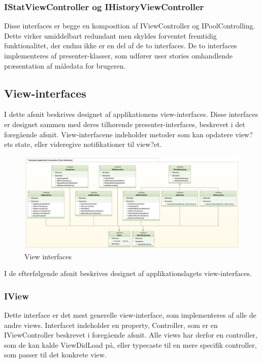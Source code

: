\subsubsection{IStatViewController og IHistoryViewController}
Disse interfaces er begge en komposition af IViewController og IPoolControlling. Dette virker umiddelbart redundant men skyldes forventet fremtidig funktionalitet, der endnu ikke er en del af de to interfaces. De to interfaces implementeres af presenter-klasser, som udfører user stories omhandlende præsentation af måledata for brugeren.

\subsection{View-interfaces}
I dette afsnit beskrives designet af applikationens view-interfaces. Disse interfaces er designet sammen med deres tilhørende presenter-interfaces, beskrevet i det foregående afsnit. View-interfacene indeholder metoder som kan opdatere view?ets state, eller videregive notifikationer til view?et.

\begin{figure}
	\centering
	\includegraphics[width=1.0\linewidth]{figs/design/application_view_interfaces}
	\caption{View interfaces}
	\label{fig:application_view_interfaces}
\end{figure}

I de efterfølgende afsnit beskrives designet af applikationslagets view-interfaces.

\subsubsection{IView}
Dette interface er det mest generelle view-interface, som implementeres af alle de andre views. Interfacet indeholder en property, Controller, som er en IViewController beskrevet i foregående afsnit. Alle views har derfor en controller, som de kan kalde ViewDidLoad på, eller typecaste til en mere specifik controller, som passer til det konkrete view.


